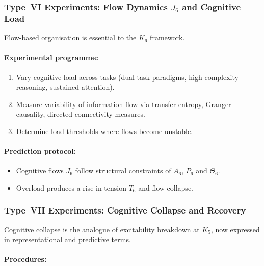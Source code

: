 \subsubsection{Type~VI Experiments: Flow Dynamics \texorpdfstring{$J_6$}{J_6} and Cognitive Load}

Flow-based organisation is essential to the $K_6$ framework.

\paragraph{Experimental programme:}

\begin{enumerate}
    \item Vary cognitive load across tasks (dual-task paradigms,
          high-complexity reasoning, sustained attention).
    \item Measure variability of information flow
          via transfer entropy, Granger causality,
          directed connectivity measures.
    \item Determine load thresholds where flows become unstable.
\end{enumerate}

\paragraph{Prediction protocol:}

\begin{itemize}
    \item Cognitive flows $J_6$ follow structural constraints of $A_6$,
          $P_6$ and $\Theta_6$.
    \item Overload produces a rise in tension $T_6$ and
          flow collapse.
\end{itemize}



\subsubsection{Type~VII Experiments: Cognitive Collapse and Recovery}

Cognitive collapse is the analogue of excitability breakdown at $K_5$,
now expressed in representational and predictive terms.

\paragraph{Procedures:}

